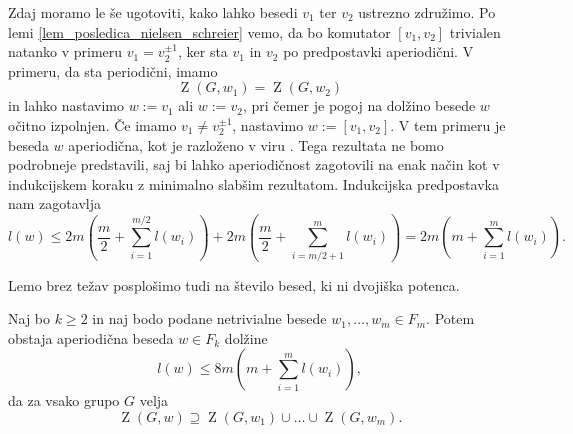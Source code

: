 \begin{dokaz}
        Zdaj moramo le še ugotoviti, kako lahko besedi $v_1$ ter $v_2$ ustrezno združimo. Po lemi \ref{lem_posledica_nielsen_schreier} vemo, da bo komutator $[v_1, v_2]$ trivialen natanko v primeru $v_1 = v_2^{\pm 1}$, ker sta $v_1$ in $v_2$ po predpostavki aperiodični. V primeru, da sta periodični, imamo \begin{equation*}
        \operatorname{Z}(G, w_1) = \operatorname{Z}(G, w_2)
        \end{equation*}  
         in lahko nastavimo $w := v_1$ ali $w := v_2$, pri čemer je pogoj na dolžino besede $w$ očitno izpolnjen. Če imamo $v_1 \neq v_2^{\pm 1}$, nastavimo $w := [v_1, v_2]$. V tem primeru je beseda $w$ aperiodična, kot je razloženo v viru \cite{Schutzenberger_1959}. Tega rezultata ne bomo podrobneje predstavili, saj bi lahko aperiodičnost
         zagotovili na enak način kot v indukcijskem koraku z minimalno slabšim rezultatom. Indukcijska predpostavka nam zagotavlja 
         \begin{equation*}
         l(w) \le 2m  \left(\frac{m}{2} + \sum_{i=1}^{m / 2} l(w_{i}) \right) + 2m \left(\frac{m}{2} + \sum_{i= m / 2 + 1}^{m} l(w_{i}) \right) = 2m \left( m + \sum_{i = 1}^{m} l(w_{i}) \right).
         \end{equation*}
    \end{dokaz}

Lemo brez težav posplošimo tudi na število besed, ki ni dvojiška potenca.
\begin{lema}
\label{lem_komutatorska_lema_splosna}
Naj bo $k \ge 2$ in naj bodo podane netrivialne besede $w_1, \ldots, w_{m} \in  F_m$. Potem obstaja aperiodična beseda $w \in F_k$ dolžine \begin{equation*}
l(w) \le 8m \left(m +  \sum_{i = 1}^{m} l(w_{i}) \right),
\end{equation*}  
da za vsako grupo $G$ velja \begin{equation*}
\operatorname{Z}(G, w) \supseteq \operatorname{Z}(G, w_1) \cup \ldots \cup  \operatorname{Z}(G, w_{m}).
\end{equation*}    
\end{lema}


